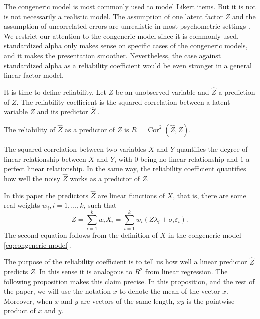 \documentclass[twoside]{article}
\DeclareMathOperator{\Cor}{Cor}
\begin{document}
The congeneric model is most commonly used to model Likert items. But it is not is not necessarily a realistic model. The assumption of one latent factor $Z$ and the assumption of uncorrelated errors are unrealistic in most psychometric settings \citep[][Section 1.2 -- 1.3]{Green2009-le}. We restrict our attention to the congeneric model since it is commonly used, standardized alpha only makes sense on specific cases of the congeneric models, and it makes the presentation smoother. Nevertheless, the case against standardized alpha as a reliability coefficient would be even stronger in a general linear factor model. 

It is time to define reliability. Let $Z$ be an unobserved variable and $\hat{Z}$ a prediction of $Z$. The reliability coefficient is the squared correlation between a latent variable $Z$ and its predictor $\hat{Z}$ \citep[][p. 61]{Lord1968-ax}. 

\begin{defn}\label{defn:reliability} The reliability of $\hat{Z}$ as a predictor of $Z$ is $ R=\Cor^{2}(\hat{Z},Z)$.
\end{defn} 

The squared correlation between two variables $X$ and $Y$ quantifies the degree of linear relationship between $X$ and $Y$, with $0$ being no linear relationship and $1$ a perfect linear relationship. In the same way, the reliability coefficient quantifies how well the noisy $\hat{Z}$ works as a predictor of $Z$.

In this paper the predictors $\hat{Z}$ are linear functions of $X$, that is, there are some real weights $w_{i},i=1,\ldots,k$, such that
\begin{equation}
\label{eq:Linear predictor}
\hat{Z} =  \sum_{i=1}^{k} w_{i}X_i = \sum_{i=1}^{k}w_{i}(Z\lambda_i + \sigma_{i} \varepsilon_i).\nonumber 
\end{equation}
The second equation follows from the definition of $X$ in the congeneric model \eqref{eq:congeneric model}. 


The purpose of the reliability coefficient is to tell us how well a linear predictor $\hat{Z}$ predicts $Z$. In this sense it is analogous to $R^2$ from linear regression. The following proposition makes this claim precise. In this proposition, and the rest of the paper, we will use the notation $\overline{x}$ to denote the mean of the vector $x$. Moreover, when $x$ and $y$ are vectors of the same length, $xy$ is the pointwise product of $x$ and $y$.
\end{document}
